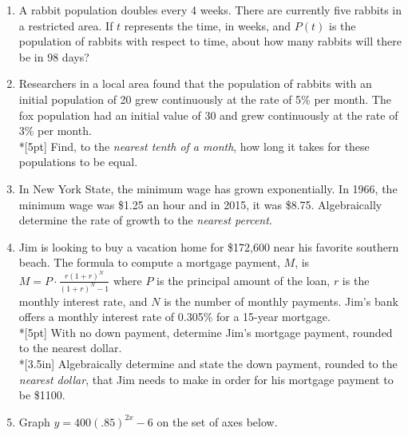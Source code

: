 \documentclass[12pt, twoside]{article}
\begin{document}
\begin{enumerate}
\item A rabbit population doubles every 4 weeks. There are currently five rabbits in a restricted area. If $t$ represents the time, in weeks, and $P(t)$ is the population of rabbits with respect to time, about how many rabbits will there be in 98 days? %

\newpage

\item Researchers in a local area found that the population of rabbits with an initial population of 20 grew continuously at the rate of 5\% per month. The fox population had an initial value of 30 and grew continuously at the rate of 3\% per month.\\*[5pt]
Find, to the \emph{nearest tenth of a month}, how long it takes for these populations to be equal.\\[3in] %

\item In New York State, the minimum wage has grown exponentially. In 1966, the minimum wage was \$1.25 an hour and in 2015, it was \$8.75. Algebraically determine the rate of growth to the \emph{nearest percent}.

\newpage
\item Jim is looking to buy a vacation home for \$172,600 near his favorite southern beach. The formula to compute a mortgage payment, $M$, is $\displaystyle M=P \cdot \frac{r(1+r)^N}{(1+r)^N-1}$ where $P$ is the principal amount of the loan, $r$ is the monthly interest rate, and $N$ is the number of monthly payments. Jim’s bank offers a monthly interest rate of 0.305\% for a 15-year mortgage.\\*[5pt]
With no down payment, determine Jim’s mortgage payment, rounded to the nearest dollar.\\*[3.5in]
Algebraically determine and state the down payment, rounded to the \emph{nearest dollar}, that Jim needs to make in order for his mortgage payment to be \$1100.

\newpage

\item Graph $y=400(.85)^{2x}-6$ on the set of axes below.
\begin{center}
\end{center} %


\end{enumerate}
\end{document}
